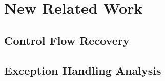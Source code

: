 \section{New Related Work}

\subsection{Control Flow Recovery}

\subsection{Exception Handling Analysis}
